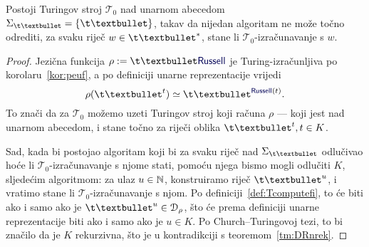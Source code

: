 \begin{lema}[{name=[neodlučivost problema zaustavljanja za jedan fiksni Turingov stroj]}]\label{lm:THaltnodl}
Postoji Turingov stroj $\mathcal T_0$ nad unarnom abecedom $\Sigma_{\t\textbullet}=\{\t\textbullet\}$, takav da nijedan algoritam ne može točno odrediti, za svaku riječ $w\in\t\textbullet^*$\!, stane li $\mathcal T_0$-izračunavanje s $w$.
\end{lema}
\begin{proof}
Jezična funkcija $\rho:=\t\textbullet\f{Russell}$ je Turing-izračunljiva po korolaru~\ref{kor:peuf}, a po definiciji unarne reprezentacije vrijedi
\begin{equation}\label{eq:rhoRussell}
    \rho(\t\textbullet^t)\simeq\t\textbullet^{\f{Russell}(t)}\text.
\end{equation}
To znači da za $\mathcal T_0$ možemo uzeti Turingov stroj koji računa $\rho$ --- koji jest nad unarnom abecedom, i stane točno za riječi oblika $\t\textbullet^t,t\in K$.

Sad, kada bi postojao algoritam koji bi za svaku riječ nad $\Sigma_{\t\textbullet}$ odlučivao hoće li $\mathcal T_0$-izračunavanje s njome stati, pomoću njega bismo mogli odlučiti $K$, sljedećim algoritmom: za ulaz $u\in{\mathbb N}$, konstruiramo riječ $\t\textbullet^u$, i vratimo stane li $\mathcal T_0$-izračunavanje s njom. Po definiciji~\ref{def:Tcomputefi}, to će biti ako i samo ako je $\t\textbullet^u\in\dom\rho$, što će prema definiciji unarne reprezentacije biti ako i samo ako je $u\in K$. Po Church--\!Turingovoj tezi, to bi značilo da je $K$ rekurzivna, što je u kontradikciji s teoremom~\ref{tm:DRnrek}.
\end{proof}

